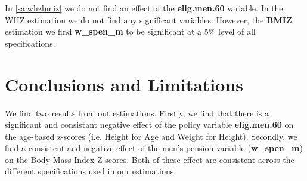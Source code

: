 \begin{refsection}
In \autoref{sa:whzbmiz} we do not find an effect of the \textbf{elig.men.60} variable.
In the WHZ estimation we do not find any significant variables.
However, the \textbf{BMIZ} estimation we find \textbf{w\_spen\_m} to be significant at a 5\% level of all specifications.


\section{Conclusions and Limitations}
We find two results from out estimations.
Firstly, we find that there is a significant and consistant negative effect of the policy variable \textbf{elig.men.60} on the age-based z-scores
(i.e. Height for Age and Weight for Height).
Secondly, we find a consistent and negative effect of the men's pension variable (\textbf{w\_spen\_m}) on the Body-Mass-Index Z-scores.
Both of these effect are consistent across the different specifications used in our estimations.







\printbibliography
\end{refsection}